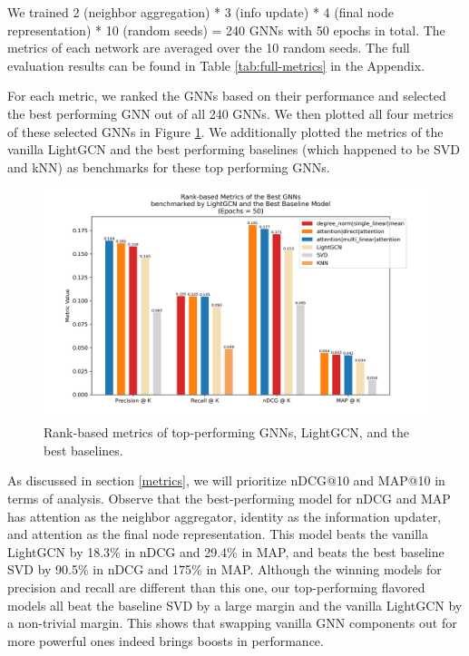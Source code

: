\documentclass{article}
\begin{document}
We trained 2 (neighbor aggregation) * 3 (info update) * 4 (final node representation) * 10 (random seeds) = 240 GNNs with 50 epochs in total. The metrics of each network are averaged over the 10 random seeds. The full evaluation results can be found in Table \ref{tab:full-metrics} in the Appendix. 

For each metric, we ranked the GNNs based on their performance and selected the best performing GNN out of all 240 GNNs. We then plotted all four metrics of these selected GNNs in Figure \ref{fig:metrics-overall}. We additionally plotted the metrics of the vanilla LightGCN and the best performing baselines (which happened to be SVD and kNN) as benchmarks for these top performing GNNs.

\begin{figure}[h]
    \centering
    \includegraphics[width=.8\textwidth]{figs/best_models_and_baselines.png}
    \caption{Rank-based metrics of top-performing GNNs, LightGCN, and the best baselines.}
    \label{fig:metrics-overall}
\end{figure}

As discussed in section \ref{metrics}, we will prioritize nDCG@10 and MAP@10 in terms of analysis. Observe that the best-performing model for nDCG and MAP has attention as the neighbor aggregator, identity as the information updater, and attention as the final node representation. This model beats the vanilla LightGCN by 18.3\% in nDCG and 29.4\% in MAP, and beats the best baseline SVD by 90.5\% in nDCG and 175\% in MAP. Although the winning models for precision and recall are different than this one, our top-performing flavored models all beat the baseline SVD by a large margin and the vanilla LightGCN by a non-trivial margin. This shows that swapping vanilla GNN components out for more powerful ones indeed brings boosts in performance.
\end{document}

